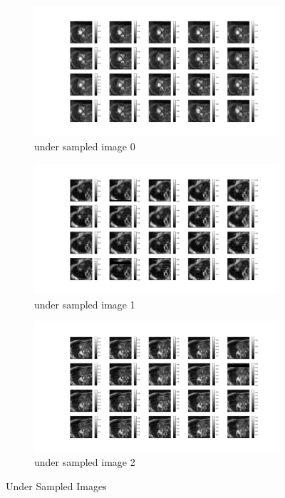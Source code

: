 \documentclass{article}
\begin{document}
\begin{figure}[ht]
  \centering
  \begin{subfigure}[b]{0.8\linewidth}
    \includegraphics[width=\linewidth]{../images/No_opt/under_sampling/under_sampling_0.png}
    \caption{under sampled image 0}
  \end{subfigure}
  \quad
  \begin{subfigure}[b]{0.8\linewidth}
    \includegraphics[width=\linewidth]{../images/No_opt/under_sampling/under_sampling_1.png}
    \caption{under sampled image 1}
  \end{subfigure}
  \quad
  \begin{subfigure}[b]{0.8\linewidth}
    \includegraphics[width=\linewidth]{../images/No_opt/under_sampling/under_sampling_2.png}
    \caption{under sampled image 2}
  \end{subfigure}
  \caption{Under Sampled Images}
\end{figure}
\end{document}
